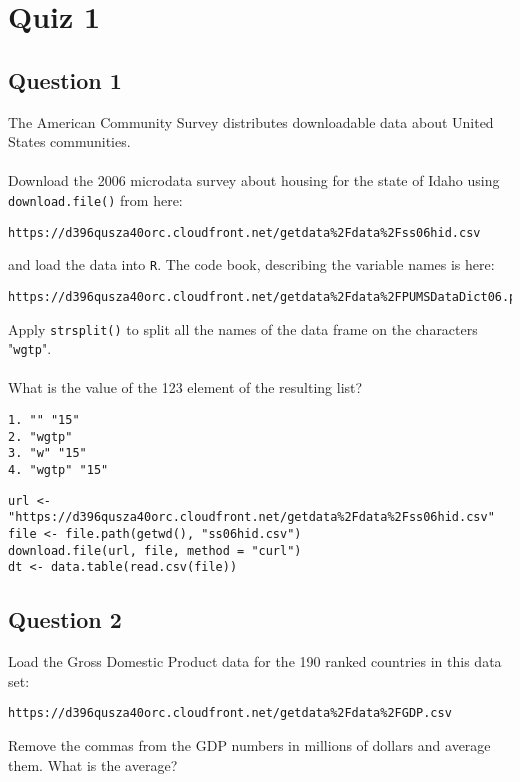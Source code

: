 \documentclass[]{article}
\begin{document}
\section*{Quiz 1}

\subsection*{Question 1}
The American Community Survey distributes downloadable data about United States communities. \\ \\ Download the 2006 microdata survey about housing for the state of Idaho using \texttt{download.file()} from here: 

\begin{verbatim}
https://d396qusza40orc.cloudfront.net/getdata%2Fdata%2Fss06hid.csv 
\end{verbatim}
and load the data into \texttt{R}. The code book, describing the variable names is here: 
\begin{verbatim}
https://d396qusza40orc.cloudfront.net/getdata%2Fdata%2FPUMSDataDict06.pdf 
\end{verbatim}
Apply \texttt{strsplit()} to split all the names of the data frame on the characters "\texttt{wgtp}". \\ \\ What is the value of the 123 element of the resulting list?
\begin{verbatim}
1. "" "15"
2. "wgtp"
3. "w" "15"
4. "wgtp" "15"
\end{verbatim}
\begin{framed}
\begin{verbatim}
url <- "https://d396qusza40orc.cloudfront.net/getdata%2Fdata%2Fss06hid.csv"
file <- file.path(getwd(), "ss06hid.csv")
download.file(url, file, method = "curl")
dt <- data.table(read.csv(file))
\end{verbatim}
\end{framed}
\newpage
\subsection*{Question 2}
Load the Gross Domestic Product data for the 190 ranked countries in this data set: 

\begin{verbatim}
https://d396qusza40orc.cloudfront.net/getdata%2Fdata%2FGDP.csv 
\end{verbatim}
Remove the commas from the GDP numbers in millions of dollars and average them. What is the average? 
\end{document}
